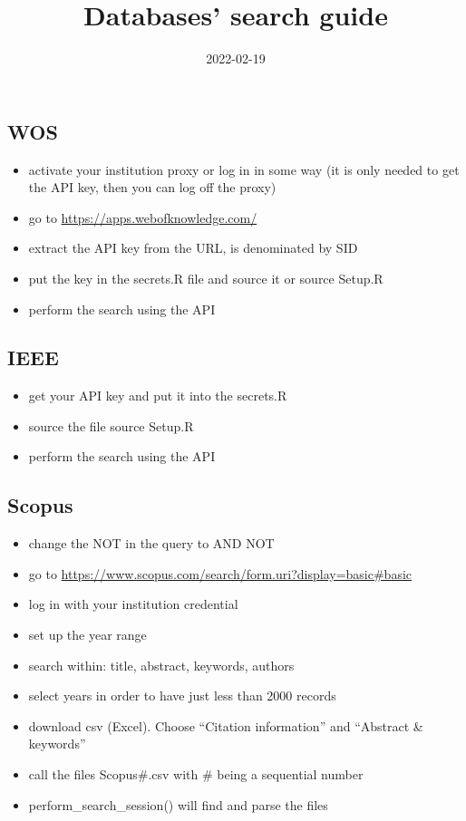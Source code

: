 \documentclass[
]{article}
\title{Databases' search guide}
\author{}
\date{\vspace{-2.5em}2022-02-19}
\providecommand{\tightlist}{%
  \setlength{\itemsep}{0pt}\setlength{\parskip}{0pt}}
\begin{document}
\maketitle

\hypertarget{wos}{%
\subsection{WOS}\label{wos}}

\begin{itemize}
\tightlist
\item
  activate your institution proxy or log in in some way (it is only
  needed to get the API key, then you can log off the proxy)
\item
  go to \url{https://apps.webofknowledge.com/}
\item
  extract the API key from the URL, is denominated by SID
\item
  put the key in the secrets.R file and source it or source Setup.R
\item
  perform the search using the API
\end{itemize}

\hypertarget{ieee}{%
\subsection{IEEE}\label{ieee}}

\begin{itemize}
\tightlist
\item
  get your API key and put it into the secrets.R
\item
  source the file source Setup.R
\item
  perform the search using the API
\end{itemize}

\hypertarget{scopus}{%
\subsection{Scopus}\label{scopus}}

\begin{itemize}
\tightlist
\item
  change the NOT in the query to AND NOT
\item
  go to
  \url{https://www.scopus.com/search/form.uri?display=basic\#basic}
\item
  log in with your institution credential
\item
  set up the year range
\item
  search within: title, abstract, keywords, authors
\item
  select years in order to have just less than 2000 records
\item
  download csv (Excel). Choose ``Citation information'' and ``Abstract
  \& keywords''
\item
  call the files Scopus\#.csv with \# being a sequential number
\item
  perform\_search\_session() will find and parse the files
\end{itemize}
\end{document}
